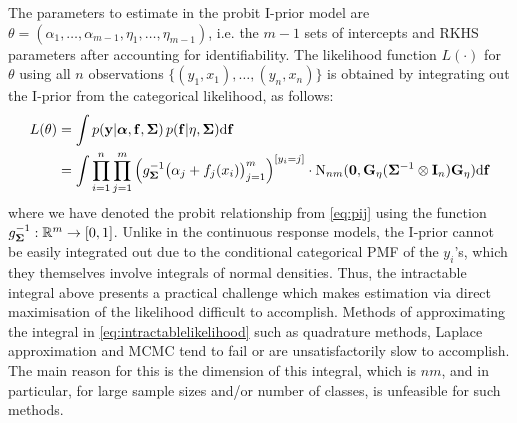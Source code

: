 

The parameters to estimate in the probit I-prior model are $\theta = (\alpha_1, \dots, \alpha_{m-1}, \eta_1, \dots, \eta_{m-1})$, i.e. the $m-1$ sets of intercepts and RKHS parameters after accounting for identifiability.
The likelihood function $L(\cdot)$ for $\theta$ using all $n$ observations $\{(y_1,x_1),\dots,(y_n,x_n)\}$ is obtained by integrating out the I-prior from the categorical likelihood, as follows:
\begin{align}
  L(\theta) 
  &= \int p({\mathbf y} | {\bm\alpha}, {\mathbf f}, {\bm\Sigma}) \, p({\mathbf f}|\eta, {\bm\Sigma}) \text{d} {\mathbf f} \nonumber \\
  &= \int \prod_{i=1}^n \prod_{j=1}^m \Big( g^{-1}_{\bm\Sigma}\big(\alpha_j + f_j(x_i)\big)_{j=1}^m \Big)^{[y_i=j]} \cdot \operatorname{N}_{nm}({\mathbf 0}, {\mathbf G}_{\eta} ({\bm\Sigma}^{-1} \otimes {\mathbf I}_n) {\mathbf G}_{\eta}) \text{d} {\mathbf f} \label{eq:intractablelikelihood}
\end{align}
where we have denoted the probit relationship from \eqref{eq:pij} using the function $g_{\bm\Sigma}^{-1}:\mathbb{R}^m \to [0,1]$.
Unlike in the continuous response models, the I-prior cannot be easily integrated out due to the conditional categorical PMF of the $y_i$'s, which they themselves involve integrals of normal densities. 
Thus, the intractable integral above presents a practical challenge which makes estimation via direct maximisation of the likelihood difficult to accomplish. 
Methods of approximating the integral in \eqref{eq:intractablelikelihood} such as quadrature methods, Laplace approximation and MCMC tend to fail or are unsatisfactorily slow to accomplish.
The main reason for this is the dimension of this integral, which is $nm$, and in particular, for large sample sizes and/or number of classes, is unfeasible for such methods.

